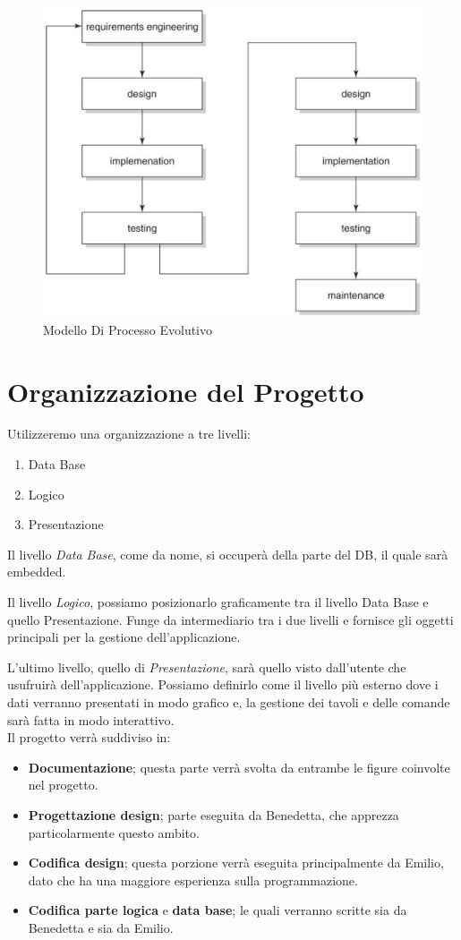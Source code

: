 \documentclass[12pt, letterpaper]{book}
\begin{document}
\begin{figure}[h]
    \centering
    \includegraphics[width = 0.7\linewidth]{../../Immagini/Modello_Processo_Evolutivo.jpg}
    \caption{Modello Di Processo Evolutivo}
    \label{fig: modello_processo_evolutivo}
\end{figure}

\section{Organizzazione del Progetto}\label{sez: organizzazioneProgetto}

Utilizzeremo una organizzazione a tre livelli:

\begin{enumerate}
    \item Data Base
    \item Logico
    \item Presentazione
\end{enumerate}
Il livello \textit{Data Base}, come da nome, si occuperà della parte del DB, il quale sarà embedded.

Il livello \textit{Logico}, possiamo posizionarlo graficamente tra il livello Data Base e quello Presentazione. Funge da intermediario tra i due livelli e fornisce gli oggetti principali per la gestione dell'applicazione.

L'ultimo livello, quello di \textit{Presentazione}, sarà quello visto dall'utente che usufruirà dell'applicazione. Possiamo definirlo come il livello più esterno dove i dati verranno presentati in modo grafico e, la gestione dei tavoli e delle comande sarà fatta in modo interattivo.\\

Il progetto verrà suddiviso in:
\begin{itemize}
    \item \textbf{Documentazione}; questa parte verrà svolta da entrambe le figure coinvolte nel progetto.
    \item \textbf{Progettazione design}; parte eseguita da Benedetta, che apprezza particolarmente questo ambito.
    \item \textbf{Codifica design}; questa porzione verrà eseguita principalmente da Emilio, dato che ha una maggiore esperienza sulla programmazione.
    \item \textbf{Codifica parte logica} e \textbf{data base}; le quali verranno scritte sia da Benedetta e sia da Emilio.
\end{itemize}
\end{document}
